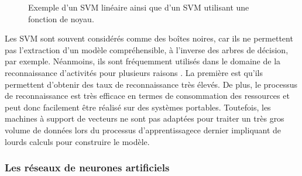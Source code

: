 \begin{figure}[H]
	\centering
	\hspace*{\fill}
	\caption{Exemple d'un SVM linéaire ainsi que d'un SVM utilisant une fonction de noyau.}
\end{figure}

Les \acs{SVM} sont souvent considérés comme des boîtes noires, car ils ne permettent pas l'extraction d'un modèle compréhensible, à l'inverse des arbres de décision, par exemple. Néanmoins, ils sont fréquemment utilisés dans le domaine de la reconnaissance d'activités pour plusieurs raisons \citep{He2009, Anguita2012}. La première est qu'ils permettent d'obtenir des taux de reconnaissance très élevés. De plus, le processus de reconnaissance est très efficace en termes de consommation des ressources et peut donc facilement être réalisé sur des systèmes portables. Toutefois, les machines à support de vecteurs ne sont pas adaptées pour traiter un très gros volume de données lors du processus d'apprentissage\textemdash ce dernier impliquant de lourds calculs pour construire le modèle.

\subsubsection{Les réseaux de neurones artificiels}

